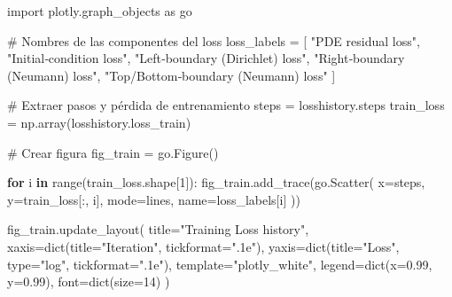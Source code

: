 \documentclass[
  spanish,
  us-letterpaper,
  DIV=11,
  numbers=noendperiod]{scrreprt}
\newenvironment{Shaded}{\begin{snugshade}}{\end{snugshade}}
\newcommand{\BuiltInTok}[1]{\textcolor[rgb]{0.00,0.23,0.31}{#1}}
\newcommand{\CommentTok}[1]{\textcolor[rgb]{0.37,0.37,0.37}{#1}}
\newcommand{\ControlFlowTok}[1]{\textcolor[rgb]{0.00,0.23,0.31}{\textbf{#1}}}
\newcommand{\DecValTok}[1]{\textcolor[rgb]{0.68,0.00,0.00}{#1}}
\newcommand{\FloatTok}[1]{\textcolor[rgb]{0.68,0.00,0.00}{#1}}
\newcommand{\ImportTok}[1]{\textcolor[rgb]{0.00,0.46,0.62}{#1}}
\newcommand{\KeywordTok}[1]{\textcolor[rgb]{0.00,0.23,0.31}{\textbf{#1}}}
\newcommand{\NormalTok}[1]{\textcolor[rgb]{0.00,0.23,0.31}{#1}}
\newcommand{\OperatorTok}[1]{\textcolor[rgb]{0.37,0.37,0.37}{#1}}
\newcommand{\StringTok}[1]{\textcolor[rgb]{0.13,0.47,0.30}{#1}}
\theoremstyle{definition}
\theoremstyle{plain}
\theoremstyle{remark}
\begin{document}
\begin{Shaded}
\begin{Highlighting}[]
\ImportTok{import}\NormalTok{ plotly.graph\_objects }\ImportTok{as}\NormalTok{ go}

\CommentTok{\# Nombres de las componentes del loss}
\NormalTok{loss\_labels }\OperatorTok{=}\NormalTok{ [}
    \StringTok{"PDE residual loss"}\NormalTok{,}
    \StringTok{"Initial‐condition loss"}\NormalTok{,}
    \StringTok{"Left‐boundary (Dirichlet) loss"}\NormalTok{,}
    \StringTok{"Right‐boundary (Neumann) loss"}\NormalTok{,}
    \StringTok{"Top/Bottom‐boundary (Neumann) loss"}
\NormalTok{]}

\CommentTok{\# Extraer pasos y pérdida de entrenamiento}
\NormalTok{steps }\OperatorTok{=}\NormalTok{ losshistory.steps}
\NormalTok{train\_loss }\OperatorTok{=}\NormalTok{ np.array(losshistory.loss\_train)}

\CommentTok{\# Crear figura}
\NormalTok{fig\_train }\OperatorTok{=}\NormalTok{ go.Figure()}

\ControlFlowTok{for}\NormalTok{ i }\KeywordTok{in} \BuiltInTok{range}\NormalTok{(train\_loss.shape[}\DecValTok{1}\NormalTok{]):}
\NormalTok{    fig\_train.add\_trace(go.Scatter(}
\NormalTok{        x}\OperatorTok{=}\NormalTok{steps,}
\NormalTok{        y}\OperatorTok{=}\NormalTok{train\_loss[:, i],}
\NormalTok{        mode}\OperatorTok{=}\StringTok{\textquotesingle{}lines\textquotesingle{}}\NormalTok{,}
\NormalTok{        name}\OperatorTok{=}\NormalTok{loss\_labels[i]}
\NormalTok{    ))}

\NormalTok{fig\_train.update\_layout(}
\NormalTok{    title}\OperatorTok{=}\StringTok{"Training Loss history"}\NormalTok{,}
\NormalTok{    xaxis}\OperatorTok{=}\BuiltInTok{dict}\NormalTok{(title}\OperatorTok{=}\StringTok{"Iteration"}\NormalTok{, tickformat}\OperatorTok{=}\StringTok{".1e"}\NormalTok{),}
\NormalTok{    yaxis}\OperatorTok{=}\BuiltInTok{dict}\NormalTok{(title}\OperatorTok{=}\StringTok{"Loss"}\NormalTok{, }\BuiltInTok{type}\OperatorTok{=}\StringTok{"log"}\NormalTok{, tickformat}\OperatorTok{=}\StringTok{".1e"}\NormalTok{),}
\NormalTok{    template}\OperatorTok{=}\StringTok{"plotly\_white"}\NormalTok{,}
\NormalTok{    legend}\OperatorTok{=}\BuiltInTok{dict}\NormalTok{(x}\OperatorTok{=}\FloatTok{0.99}\NormalTok{, y}\OperatorTok{=}\FloatTok{0.99}\NormalTok{),}
\NormalTok{    font}\OperatorTok{=}\BuiltInTok{dict}\NormalTok{(size}\OperatorTok{=}\DecValTok{14}\NormalTok{)}
\NormalTok{)}
\end{Highlighting}
\end{Shaded}
\end{document}

